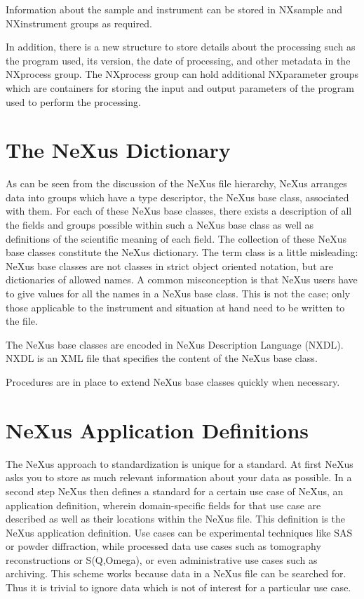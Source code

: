 \documentclass[%
 aip,
rsi,
 amsmath,amssymb,
 reprint,%
]{revtex4-1}
\begin{document}
Information about the sample and instrument can be stored in NXsample and NXinstrument groups as required. 

In addition, there is a new structure to store details about the processing such as the program used, its version, 
the date of processing, and other metadata 
in the NXprocess group. The NXprocess group can hold additional NXparameter groups which are containers 
for storing the input and output parameters of the program used to perform the processing. 


\section{The NeXus Dictionary}

As can be seen from the discussion of the NeXus file hierarchy, NeXus arranges data into groups which have a 
type descriptor, the NeXus base class, associated with them. For each of these NeXus base classes, there 
exists a description of all the fields and groups possible within such a NeXus base class as well as definitions 
of the scientific meaning of each field. The collection of these NeXus base classes constitute the NeXus dictionary. 
The term class is a little misleading: NeXus base classes are not classes in strict object oriented notation, but 
are dictionaries of allowed names. A common misconception is that NeXus users have to give values for all the 
names in a NeXus base class. This is not the case; only those applicable to the instrument and situation at hand need 
to be written to the file.

The NeXus base classes are encoded in NeXus Description Language (NXDL).
NXDL is an XML file that specifies the content of the NeXus base class.

Procedures are in place to extend NeXus base classes quickly when necessary.


\section{NeXus Application Definitions}

The NeXus approach to standardization is unique for a standard. At first NeXus asks you to store 
as much relevant information about your data as possible. In a second step NeXus then defines a 
standard for a certain use case of NeXus, an application definition, wherein domain-specific fields 
for that use case are described as well as their locations within the NeXus file. This 
definition is the NeXus application definition. Use cases can be experimental techniques like SAS or 
powder diffraction, while processed data use cases such as tomography reconstructions or S(Q,Omega), 
or even administrative use cases such as archiving. This scheme works because data in a NeXus file 
can be searched for. Thus it is trivial to ignore data which is not of interest for a particular use case.
\end{document}
